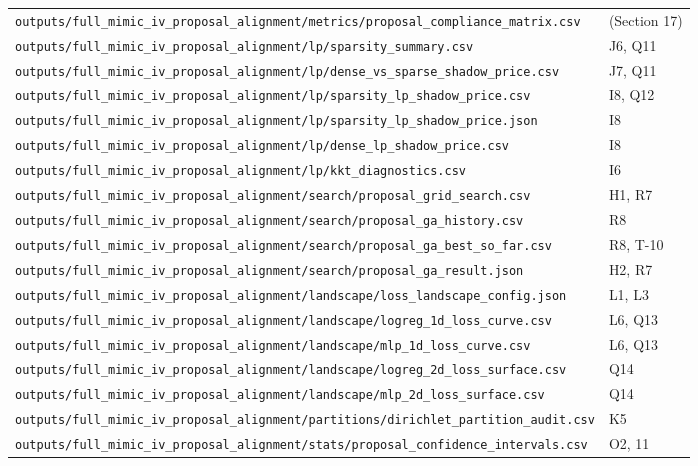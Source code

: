 \documentclass{article}
\begin{document}
\begin{table}[H]
{\begin{tabular}{ll}
    \texttt{outputs/full\_mimic\_iv\_proposal\_alignment/metrics/proposal\_compliance\_matrix.csv} & (Section 17) \\
    \texttt{outputs/full\_mimic\_iv\_proposal\_alignment/lp/sparsity\_summary.csv} & J6, Q11 \\
    \texttt{outputs/full\_mimic\_iv\_proposal\_alignment/lp/dense\_vs\_sparse\_shadow\_price.csv} & J7, Q11 \\
    \texttt{outputs/full\_mimic\_iv\_proposal\_alignment/lp/sparsity\_lp\_shadow\_price.csv} & I8, Q12 \\
    \texttt{outputs/full\_mimic\_iv\_proposal\_alignment/lp/sparsity\_lp\_shadow\_price.json} & I8 \\
    \texttt{outputs/full\_mimic\_iv\_proposal\_alignment/lp/dense\_lp\_shadow\_price.csv} & I8 \\
    \texttt{outputs/full\_mimic\_iv\_proposal\_alignment/lp/kkt\_diagnostics.csv} & I6 \\
    \texttt{outputs/full\_mimic\_iv\_proposal\_alignment/search/proposal\_grid\_search.csv} & H1, R7 \\
    \texttt{outputs/full\_mimic\_iv\_proposal\_alignment/search/proposal\_ga\_history.csv} & R8 \\
    \texttt{outputs/full\_mimic\_iv\_proposal\_alignment/search/proposal\_ga\_best\_so\_far.csv} & R8, T-10 \\
    \texttt{outputs/full\_mimic\_iv\_proposal\_alignment/search/proposal\_ga\_result.json} & H2, R7 \\
    \texttt{outputs/full\_mimic\_iv\_proposal\_alignment/landscape/loss\_landscape\_config.json} & L1, L3 \\
    \texttt{outputs/full\_mimic\_iv\_proposal\_alignment/landscape/logreg\_1d\_loss\_curve.csv} & L6, Q13 \\
    \texttt{outputs/full\_mimic\_iv\_proposal\_alignment/landscape/mlp\_1d\_loss\_curve.csv} & L6, Q13 \\
    \texttt{outputs/full\_mimic\_iv\_proposal\_alignment/landscape/logreg\_2d\_loss\_surface.csv} & Q14 \\
    \texttt{outputs/full\_mimic\_iv\_proposal\_alignment/landscape/mlp\_2d\_loss\_surface.csv} & Q14 \\
    \texttt{outputs/full\_mimic\_iv\_proposal\_alignment/partitions/dirichlet\_partition\_audit.csv} & K5 \\
    \texttt{outputs/full\_mimic\_iv\_proposal\_alignment/stats/proposal\_confidence\_intervals.csv} & O2, 11 \\

\end{tabular}}
\end{table}
\end{document}
